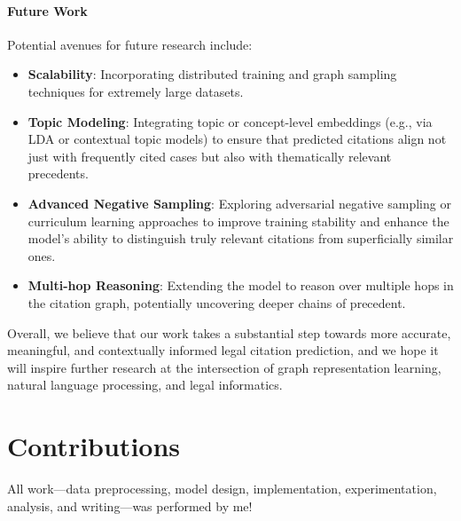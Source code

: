 \documentclass{article}
\begin{document}
\paragraph{Future Work}
Potential avenues for future research include:
\begin{itemize}[leftmargin=*]
    \item \textbf{Scalability}: Incorporating distributed training and graph sampling techniques for extremely large datasets.
    \item \textbf{Topic Modeling}: Integrating topic or concept-level embeddings (e.g., via LDA or contextual topic models) to ensure that predicted citations align not just with frequently cited cases but also with thematically relevant precedents.
    \item \textbf{Advanced Negative Sampling}: Exploring adversarial negative sampling or curriculum learning approaches to improve training stability and enhance the model’s ability to distinguish truly relevant citations from superficially similar ones.
    \item \textbf{Multi-hop Reasoning}: Extending the model to reason over multiple hops in the citation graph, potentially uncovering deeper chains of precedent.
\end{itemize}
    
Overall, we believe that our work takes a substantial step towards more accurate, meaningful, and contextually informed legal citation prediction, and we hope it will inspire further research at the intersection of graph representation learning, natural language processing, and legal informatics.

\section*{Contributions}
All work—data preprocessing, model design, implementation, experimentation, analysis, and writing—was performed by me!

\medskip

\small



\end{document}
